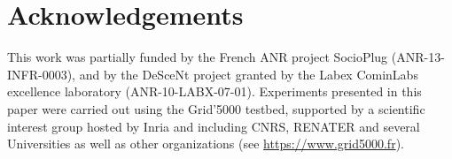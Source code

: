 \section*{Acknowledgements}

This work was partially funded by the French ANR project SocioPlug
(ANR-13-INFR-0003), and by the DeSceNt project granted by the Labex CominLabs
excellence laboratory (ANR-10-LABX-07-01).  Experiments presented in this paper
were carried out using the Grid'5000 testbed, supported by a scientific interest
group hosted by Inria and including CNRS, RENATER and several Universities as
well as other organizations (see \url{https://www.grid5000.fr}).
